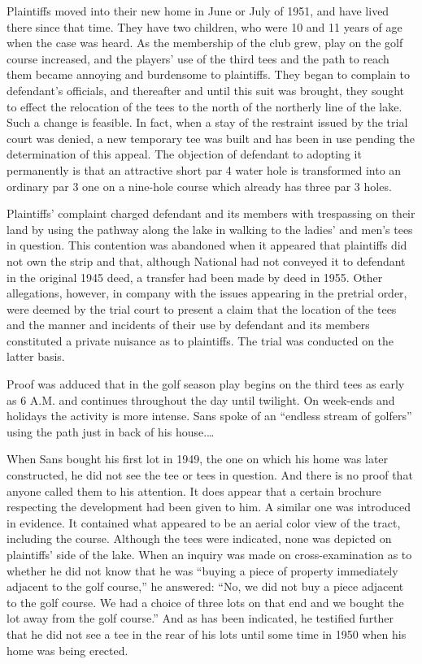 Plaintiffs moved into their new home in June or July of 1951, and have lived
there since that time. They have two children, who were 10 and 11 years of age
when the case was heard. As the membership of the club grew, play on the golf
course increased, and the players' use of the third tees and the path to reach
them became annoying and burdensome to plaintiffs. They began to complain to
defendant's officials, and thereafter and until this suit was brought, they
sought to effect the relocation of the tees to the north of the northerly line
of the lake. Such a change is feasible. In fact, when a stay of the restraint
issued by the trial court was denied, a new temporary tee was built and has been
in use pending the determination of this appeal. The objection of defendant to
adopting it permanently is that an attractive short par 4 water hole is
transformed into an ordinary par 3 one on a nine-hole course which already has
three par 3 holes.

Plaintiffs' complaint charged defendant and its members with trespassing on
their land by using the pathway along the lake in walking to the ladies' and
men's tees in question. This contention was abandoned when it appeared that
plaintiffs did not own the strip and that, although National had not conveyed it
to defendant in the original 1945 deed, a transfer had been made by deed in
1955. Other allegations, however, in company with the issues appearing in the
pretrial order, were deemed by the trial court to present a claim that the
location of the tees and the manner and incidents of their use by defendant and
its members constituted a private nuisance as to plaintiffs. The trial was
conducted on the latter basis.

Proof was adduced that in the golf season play begins on the third tees as early
as 6 A.M. and continues throughout the day until twilight. On week-ends and
holidays the activity is more intense. Sans spoke of an ``endless stream of
golfers'' using the path just in back of his house.\ldots 

When Sans bought his first lot in 1949, the one on which his home was later
constructed, he did not see the tee or tees in question. And there is no proof
that anyone called them to his attention. It does appear that a certain brochure
respecting the development had been given to him. A similar one was introduced
in evidence. It contained what appeared to be an aerial color view of the tract,
including the course. Although the tees were indicated, none was depicted on
plaintiffs' side of the lake. When an inquiry was made on cross-examination as
to whether he did not know that he was ``buying a piece of property immediately
adjacent to the golf course,'' he answered: ``No, we did not buy a piece
adjacent to the golf course. We had a choice of three lots on that end and we
bought the lot away from the golf course.'' And as has been indicated, he
testified further that he did not see a tee in the rear of his lots until some
time in 1950 when his home was being erected.

